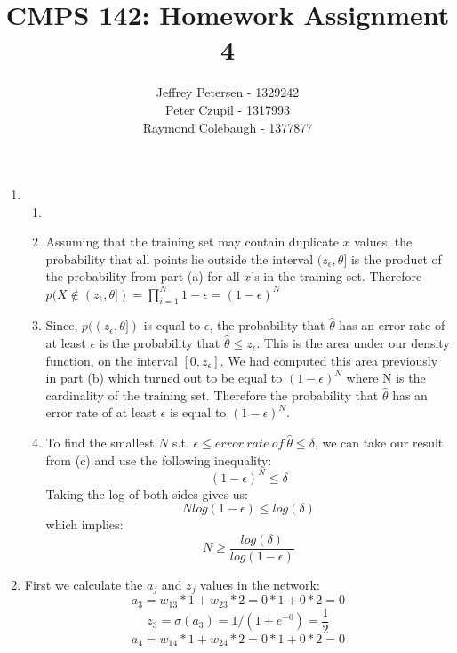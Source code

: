 \documentclass{article}
\title{CMPS 142: Homework Assignment 4}
\author{Jeffrey Petersen - 1329242\\Peter Czupil - 1317993\\Raymond Colebaugh - 1377877}
\begin{document}
\maketitle
\begin{enumerate}
        \item 
            \begin{enumerate}
                \item
                    \noindent{The probability that a point randomly drawn from $p$ is located somewhere in the interval $(z_{\epsilon}, \theta)$ is equal to $\epsilon$. Thus the probability that a point falls outside this interval is the complement of the previous probability. Therefore, $p((0, z_{\epsilon}]) = 1 - \epsilon$. }
                \item
                    Assuming that the training set may contain duplicate $x$ values, the probability that all points lie outside the interval $(z_{\epsilon}, \theta]$ is the product of the probability from part (a) for all $x$'s in the training set. Therefore $p(X \notin (z_{\epsilon}, \theta]) = \prod_{i = 1}^{N} 1 - \epsilon = (1 - \epsilon)^N$ 
                \item
                    Since, $p((z_{\epsilon}, \theta])$ is equal to $\epsilon$, the probability that ${\hat {\theta}}$ has an error rate of at least $\epsilon$ is the probability that ${\hat {\theta}} \leq z_{\epsilon}$. This is the area under our density function, on the interval $[0, z_{\epsilon}]$. We had computed this area previously in part (b) which turned out to be equal to $(1 - \epsilon)^N$ where N is the cardinality of the training set. Therefore the probability that ${\hat {\theta}}$ has an error rate of at least $\epsilon$ is equal to $(1 - \epsilon)^N$.
                \item
                 To find the smallest $N$ s.t. $\epsilon  \leq error\ rate\ of\ {\hat {\theta}} \leq \delta$, we can take our result from (c) and use the following inequality: 
$$ (1 - \epsilon)^N \leq \delta $$
Taking the log of both sides gives us:
$$Nlog(1 - \epsilon) \leq log(\delta)$$ 
which implies:
$$N \geq \frac{log(\delta)}{log(1 - \epsilon)}$$
            \end{enumerate}
        \item 
            First we calculate the $a_j$ and $z_j$ values in the network:
            $$ a_3 = w_{13} * 1 + w_{23} * 2 = 0 * 1 + 0 * 2 = 0 $$
            $$ z_3 = \sigma(a_3) = 1/(1+e^{-0}) = \frac{1}{2} $$
            $$ a_4 = w_{14} * 1 + w_{24} * 2 = 0 * 1 + 0 * 2 = 0 $$

\end{enumerate}
\end{document}
